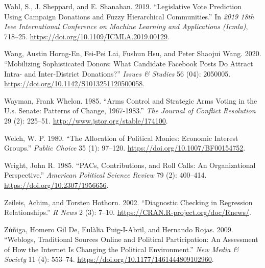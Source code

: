 \documentclass[12pt,]{article}
\begin{document}
\leavevmode\hypertarget{ref-wahl2019}{}%
Wahl, S., J. Sheppard, and E. Shanahan. 2019. ``Legislative Vote
Prediction Using Campaign Donations and Fuzzy Hierarchical
Communities.'' In \emph{2019 18th Ieee International Conference on
Machine Learning and Applications (Icmla)}, 718--25.
\url{https://doi.org/10.1109/ICMLA.2019.00129}.

\leavevmode\hypertarget{ref-wang2020}{}%
Wang, Austin Horng-En, Fei-Pei Lai, Fushun Hsu, and Peter Shaojui Wang.
2020. ``Mobilizing Sophisticated Donors: What Candidate Facebook Posts
Do Attract Intra- and Inter-District Donations?'' \emph{Issues \&
Studies} 56 (04): 2050005.
\url{https://doi.org/10.1142/S1013251120500058}.

\leavevmode\hypertarget{ref-wayman1985}{}%
Wayman, Frank Whelon. 1985. ``Arms Control and Strategic Arms Voting in
the U.s. Senate: Patterns of Change, 1967-1983.'' \emph{The Journal of
Conflict Resolution} 29 (2): 225--51.
\url{http://www.jstor.org/stable/174100}.

\leavevmode\hypertarget{ref-welch1980}{}%
Welch, W. P. 1980. ``The Allocation of Political Monies: Economic
Interest Groups.'' \emph{Public Choice} 35 (1): 97--120.
\url{https://doi.org/10.1007/BF00154752}.

\leavevmode\hypertarget{ref-wright1985}{}%
Wright, John R. 1985. ``PACs, Contributions, and Roll Calls: An
Organizational Perspective.'' \emph{American Political Science Review}
79 (2): 400--414. \url{https://doi.org/10.2307/1956656}.

\leavevmode\hypertarget{ref-lmtest}{}%
Zeileis, Achim, and Torsten Hothorn. 2002. ``Diagnostic Checking in
Regression Relationships.'' \emph{R News} 2 (3): 7--10.
\url{https://CRAN.R-project.org/doc/Rnews/}.

\leavevmode\hypertarget{ref-dezuniga2009}{}%
Zúñiga, Homero Gil De, Eulàlia Puig-I-Abril, and Hernando Rojas. 2009.
``Weblogs, Traditional Sources Online and Political Participation: An
Assessment of How the Internet Is Changing the Political Environment.''
\emph{New Media \& Society} 11 (4): 553--74.
\url{https://doi.org/10.1177/1461444809102960}.





\newpage
\singlespacing 
\end{document}
